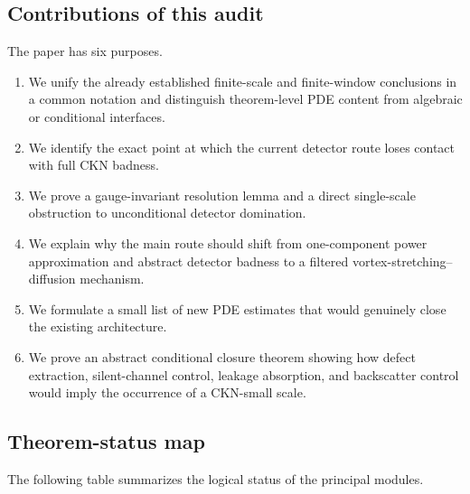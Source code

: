 \documentclass[11pt]{article}
\numberwithin{equation}{section}
\theoremstyle{remark}
\begin{document}
\subsection{Contributions of this audit}

The paper has six purposes.
\begin{enumerate}
\item We unify the already established finite-scale and finite-window conclusions in a common notation and distinguish theorem-level PDE content from algebraic or conditional interfaces.
\item We identify the exact point at which the current detector route loses contact with full CKN badness.
\item We prove a gauge-invariant resolution lemma and a direct single-scale obstruction to unconditional detector domination.
\item We explain why the main route should shift from one-component power approximation and abstract detector badness to a filtered vortex-stretching--diffusion mechanism.
\item We formulate a small list of new PDE estimates that would genuinely close the existing architecture.
\item We prove an abstract conditional closure theorem showing how defect extraction, silent-channel control, leakage absorption, and backscatter control would imply the occurrence of a CKN-small scale.
\end{enumerate}

\subsection{Theorem-status map}

The following table summarizes the logical status of the principal modules.
\end{document}
